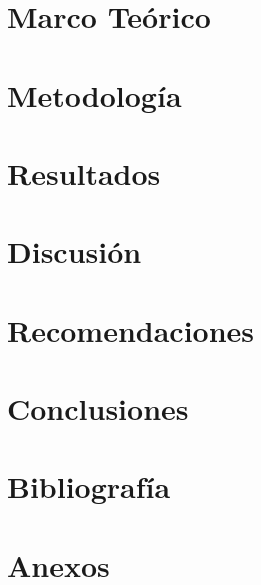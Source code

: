\documentclass[12pt,letterpaper]{article}
\begin{document}
	\section{Marco Teórico}
	
	
	\section{Metodología}
	
	
	\section{Resultados}
	
	
	\section{Discusión}
	
	
	\section{Recomendaciones}
	
	
	\section{Conclusiones}
	
	
	\clearpage
	\section*{Bibliografía}
	\printbibliography[heading=none] %
	
	\appendix
	\clearpage
	\section{Anexos}
	
	
\end{document}
